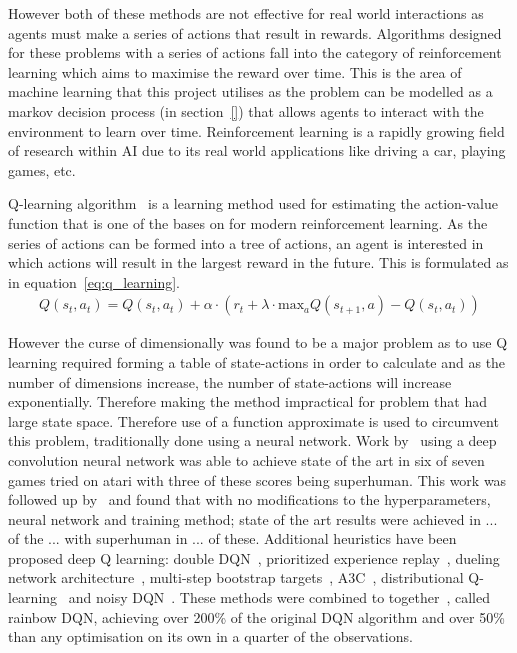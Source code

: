 However both of these methods are not effective for real world interactions as agents must make a series of
actions that result in rewards. Algorithms designed for these problems with a series of actions fall into the category
of reinforcement learning which aims to maximise the reward over time. This is the area of machine learning that this
project utilises as the problem can be modelled as a markov decision process (in section~\ref{}) that allows agents
to interact with the environment to learn over time. Reinforcement learning is a rapidly growing field of research
within AI due to its real world applications like driving a car, playing games, etc.

Q-learning algorithm~\cite{} is a learning method used for estimating the action-value function that is one of the
bases on for modern reinforcement learning. As the series of actions can be formed into a tree of actions, an agent
is interested in which actions will result in the largest reward in the future. This is formulated as in
equation~\eqref{eq:q_learning}.
\begin{align}
    Q(s_t, a_t) = Q(s_t, a_t) + \alpha \cdot (r_t + \lambda \cdot \text{max}_a Q(s_{t+1} , a) - Q(s_t, a_t) ) \label{eq:q_learning}
\end{align}

However the curse of dimensionally was found to be a major problem as to use Q learning required
forming a table of state-actions in order to calculate and as the number of dimensions increase, the number of
state-actions will increase exponentially. Therefore making the method impractical for problem that had large state
space. Therefore use of a function approximate is used to circumvent this problem, traditionally done using a neural
network. Work by~\cite{} using a deep convolution neural network was able to achieve state of the art in six of seven
games tried on atari with three of these scores being superhuman. This work was followed up by~\cite{} and found that
with no modifications to the hyperparameters, neural network and training method; state of the art results were
achieved in ... of the ... with superhuman in ... of these. Additional heuristics have been proposed deep Q learning:
double DQN~\cite{}, prioritized experience replay~\cite{}, dueling network architecture~\cite{}, multi-step bootstrap
targets~\cite{}, A3C~\cite{}, distributional Q-learning~\cite{} and noisy DQN~\cite{}. These methods were combined
to together~\cite{}, called rainbow DQN, achieving over 200\% of the original DQN algorithm and over 50\% than any optimisation on its
own in a quarter of the observations.

